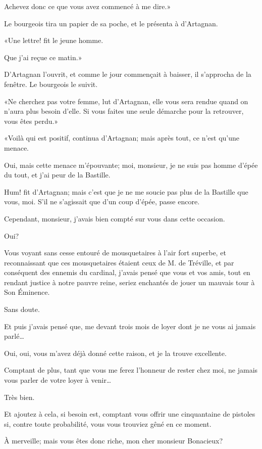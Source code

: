 \speak  Achevez donc ce que vous avez commencé à me dire.» 

Le bourgeois tira un papier de sa poche, et le présenta à d'Artagnan. 

«Une lettre! fit le jeune homme. 

\speak  Que j'ai reçue ce matin.» 

D'Artagnan l'ouvrit, et comme le jour commençait à baisser, il s'approcha de la fenêtre. Le bourgeois le suivit. 

«Ne cherchez pas votre femme, lut d'Artagnan, elle vous sera rendue quand on n'aura plus besoin d'elle. Si vous faites une seule démarche pour la retrouver, vous êtes perdu.» 

«Voilà qui est positif, continua d'Artagnan; mais après tout, ce n'est qu'une menace. 

\speak  Oui, mais cette menace m'épouvante; moi, monsieur, je ne suis pas homme d'épée du tout, et j'ai peur de la Bastille. 

\speak  Hum! fit d'Artagnan; mais c'est que je ne me soucie pas plus de la Bastille que vous, moi. S'il ne s'agissait que d'un coup d'épée, passe encore. 

\speak  Cependant, monsieur, j'avais bien compté sur vous dans cette occasion. 

\speak  Oui? 

\speak  Vous voyant sans cesse entouré de mousquetaires à l'air fort superbe, et reconnaissant que ces mousquetaires étaient ceux de M. de Tréville, et par conséquent des ennemis du cardinal, j'avais pensé que vous et vos amis, tout en rendant justice à notre pauvre reine, seriez enchantés de jouer un mauvais tour à Son Éminence. 

\speak  Sans doute. 

\speak  Et puis j'avais pensé que, me devant trois mois de loyer dont je ne vous ai jamais parlé\dots 

\speak  Oui, oui, vous m'avez déjà donné cette raison, et je la trouve excellente. 

\speak  Comptant de plus, tant que vous me ferez l'honneur de rester chez moi, ne jamais vous parler de votre loyer à venir\dots 

\speak  Très bien. 

\speak  Et ajoutez à cela, si besoin est, comptant vous offrir une cinquantaine de pistoles si, contre toute probabilité, vous vous trouviez gêné en ce moment. 

\speak  À merveille; mais vous êtes donc riche, mon cher monsieur Bonacieux? 

